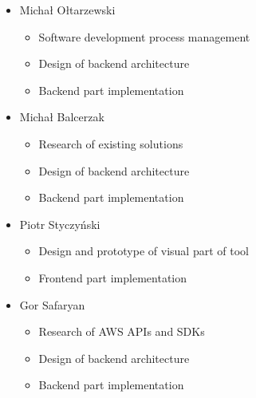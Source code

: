 \documentclass[licencjacka,en]{thesisclass}
\begin{document}
      \begin{itemize}
        \item Michał Ołtarzewski
        \begin{itemize}
          \item Software development process management
          \item Design of backend architecture
          \item Backend part implementation
        \end{itemize}
        \item Michał Balcerzak
        \begin{itemize}
          \item Research of existing solutions
          \item Design of backend architecture
          \item Backend part implementation
        \end{itemize}
        \item Piotr Styczyński
        \begin{itemize}
          \item Design and prototype of visual part of tool
          \item Frontend part implementation
        \end{itemize}
        \item Gor Safaryan
        \begin{itemize}
          \item Research of AWS APIs and SDKs
          \item Design of backend architecture
          \item Backend part implementation
        \end{itemize}
      \end{itemize}
\end{document}
